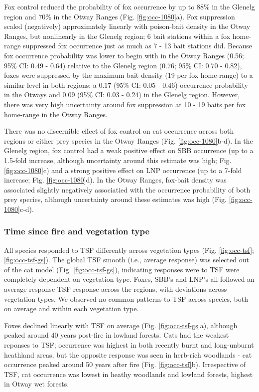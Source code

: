 \documentclass[11pt,a4paper,titlepage,twoside,openright]{style/unimelbthesis}
\begin{document}
\begin{mainmatter}
Fox control reduced the probability of fox occurrence by up to 88\% in the Glenelg region and 70\% in the Otway Ranges (Fig. \ref{fig:occ-1080}a). Fox suppression scaled (negatively) approximately linearly with poison-bait density in the Otway Ranges, but nonlinearly in the Glenelg region; 6 bait stations within a fox home-range suppressed fox occurrence just as much as 7 - 13 bait stations did. Because fox occurrence probability was lower to begin with in the Otway Ranges (0.56; 95\% CI: 0.49 - 0.64) relative to the Glenelg region (0.76; 95\% CI: 0.70 - 0.82), foxes were suppressed by the maximum bait density (19 per fox home-range) to a similar level in both regions: a 0.17 (95\% CI: 0.05 - 0.46) occurrence probability in the Otways and 0.09 (95\% CI: 0.03 - 0.24) in the Glenelg region. However, there was very high uncertainty around fox suppression at 10 - 19 baits per fox home-range in the Otway Ranges.

There was no discernible effect of fox control on cat occurrence across both regions or either prey species in the Otway Ranges (Fig. \ref{fig:occ-1080}b-d). In the Glenelg region, fox control had a weak positive effect on SBB occurrence (up to a 1.5-fold increase, although uncertainty around this estimate was high; Fig. \ref{fig:occ-1080}c) and a strong positive effect on LNP occurrence (up to a 7-fold increase; Fig. \ref{fig:occ-1080}d). In the Otway Ranges, fox-bait density was associated slightly negatively associatied with the occurrence probability of both prey species, although uncertainty around these estimates was high (Fig. \ref{fig:occ-1080}c-d).

\hypertarget{time-since-fire-and-vegetation-type-1}{%
\subsubsection{Time since fire and vegetation type}\label{time-since-fire-and-vegetation-type-1}}

All species responded to TSF differently across vegetation types (Fig. \ref{fig:occ-tsf}; \ref{fig:occ-tsf-gs}). The global TSF smooth (i.e., average response) was selected out of the cat model (Fig. \ref{fig:occ-tsf-gs}), indicating responses were to TSF were completely dependent on vegetation type. Foxes, SBB's and LNP's all followed an average response TSF response across the regions, with deviations across vegetation types. We observed no common patterns to TSF across species, both on average and within each vegetation type.

Foxes declined linearly with TSF on average (Fig. \ref{fig:occ-tsf-gs}a), although peaked around 40 years post-fire in lowland forests. Cats had the weakest reponses to TSF; occurrence was highest in both recently burnt and long-unburnt heathland areas, but the opposite response was seen in herb-rich woodlands - cat occurrence peaked around 50 years after fire (Fig. \ref{fig:occ-tsf}b). Irrespective of TSF, cat occurrence was lowest in heathy woodlands and lowland forests, highest in Otway wet forests.


\end{mainmatter}
\end{document}
